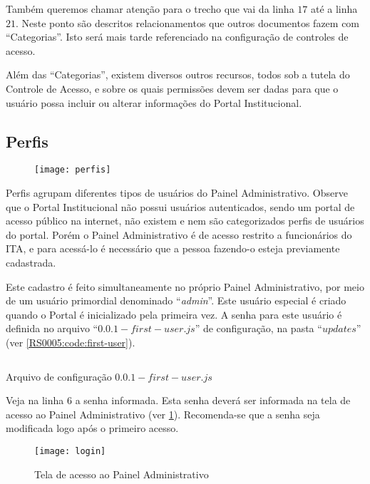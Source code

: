 Também queremos chamar atenção para o trecho que vai da linha $17$ até a linha $21$. Neste ponto são descritos relacionamentos que outros documentos fazem com ``Categorias''. Isto será mais tarde referenciado na configuração de controles de acesso.

Além das ``Categorias'', existem diversos outros recursos, todos sob a tutela do Controle de Acesso, e sobre os quais permissões devem ser dadas para que o usuário possa incluir ou alterar informações do Portal Institucional.

\subsection{Perfis}

\begin{figure}[!ht]
    \centering
    \texttt{[image: perfis]}
\end{figure}

Perfis agrupam diferentes tipos de usuários do Painel Administrativo. Observe que o Portal Institucional não possui usuários autenticados, sendo um portal de acesso público na internet, não existem e nem são categorizados perfis de usuários do portal. Porém o Painel Administrativo é de acesso restrito a funcionários do \gls{ITA}, e para acessá-lo é necessário que a pessoa fazendo-o esteja previamente cadastrada.

Este cadastro é feito simultaneamente no próprio Painel Administrativo, por meio de um usuário primordial denominado ``\textit{admin}''. Este usuário especial é criado quando o Portal é inicializado pela primeira vez. A senha para este usuário é definida no arquivo ``$0.0.1-first-user.js$'' de configuração, na pasta ``$updates$'' (ver \cref{RS0005:code:first-user}).

\begin{code}
    \inputminted[xleftmargin=20pt,fontsize=\footnotesize,breaklines,breakanywhere,linenos=true,label=0.0.1-first-user.js]{JavaScript}{../RS0005/anexos/0.0.1-first-user.js}
    \caption{Arquivo de configuração $0.0.1-first-user.js$}\label{RS0005:code:first-user}
\end{code}

Veja na linha $6$ a senha informada. Esta senha deverá ser informada na tela de acesso ao Painel Administrativo (ver \cref{RS0005:fig:login}). Recomenda-se que a senha seja modificada logo após o primeiro acesso.

\begin{figure}[!ht]
    \centering
    \texttt{[image: login]}
    \caption{Tela de acesso ao Painel Administrativo}\label{RS0005:fig:login}
\end{figure}

